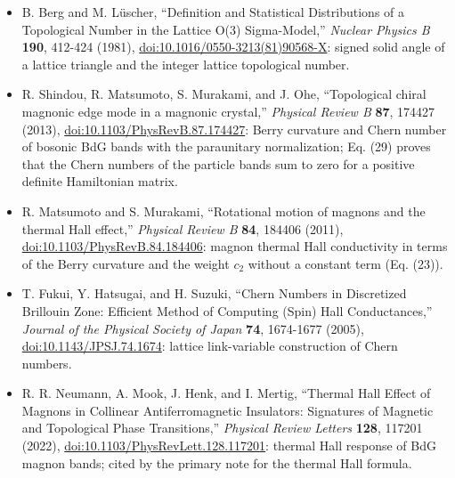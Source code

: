 \begin{itemize}
\tightlist
\item
  B. Berg and M. Lüscher, ``Definition and Statistical Distributions of a Topological Number in the Lattice O(3) Sigma-Model,'' \emph{Nuclear Physics B} \textbf{190}, 412-424 (1981), \href{https://doi.org/10.1016/0550-3213(81)90568-X}{doi:10.1016/0550-3213(81)90568-X}: signed solid angle of a lattice triangle and the integer lattice topological number.
\item
  R. Shindou, R. Matsumoto, S. Murakami, and J. Ohe, ``Topological chiral magnonic edge mode in a magnonic crystal,'' \emph{Physical Review B} \textbf{87}, 174427 (2013), \href{https://doi.org/10.1103/PhysRevB.87.174427}{doi:10.1103/PhysRevB.87.174427}: Berry curvature and Chern number of bosonic BdG bands with the paraunitary normalization; Eq. (29) proves that the Chern numbers of the particle bands sum to zero for a positive definite Hamiltonian matrix.
\item
  R. Matsumoto and S. Murakami, ``Rotational motion of magnons and the thermal Hall effect,'' \emph{Physical Review B} \textbf{84}, 184406 (2011), \href{https://doi.org/10.1103/PhysRevB.84.184406}{doi:10.1103/PhysRevB.84.184406}: magnon thermal Hall conductivity in terms of the Berry curvature and the weight \(c_2\) without a constant term (Eq. (23)).
\item
  T. Fukui, Y. Hatsugai, and H. Suzuki, ``Chern Numbers in Discretized Brillouin Zone: Efficient Method of Computing (Spin) Hall Conductances,'' \emph{Journal of the Physical Society of Japan} \textbf{74}, 1674-1677 (2005), \href{https://doi.org/10.1143/JPSJ.74.1674}{doi:10.1143/JPSJ.74.1674}: lattice link-variable construction of Chern numbers.
\item
  R. R. Neumann, A. Mook, J. Henk, and I. Mertig, ``Thermal Hall Effect of Magnons in Collinear Antiferromagnetic Insulators: Signatures of Magnetic and Topological Phase Transitions,'' \emph{Physical Review Letters} \textbf{128}, 117201 (2022), \href{https://doi.org/10.1103/PhysRevLett.128.117201}{doi:10.1103/PhysRevLett.128.117201}: thermal Hall response of BdG magnon bands; cited by the primary note for the thermal Hall formula.
\end{itemize}

